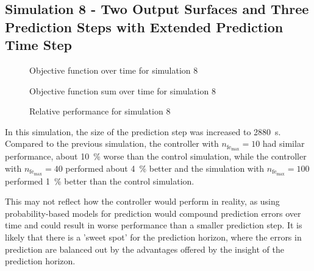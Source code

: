 \documentclass[conference]{IEEEtran}
\begin{document}
\subsection{Simulation 8 - Two Output Surfaces and Three Prediction Steps with Extended Prediction Time Step} \label{subsec:results_SS08}

\begin{figure}[h]
    \centering
    
    \caption{Objective function over time for simulation 8}
    \label{fig:SS08_obj_hist}
\end{figure}

%     

\begin{figure}[h]
    \centering
    
    \caption{Objective function sum over time for simulation 8}
    \label{fig:SS08_s_obj_hist}
\end{figure}

\begin{figure}[h]
    \centering
    
    \caption{Relative performance for simulation 8}
    \label{fig:SS08_s_obj_rel}
\end{figure}

In this simulation, the size of the prediction step was increased to \SI{2880}{\second}.
Compared to the previous simulation, the controller with $n_{\text{fe}_{\text{max}}} = 10$ had similar performance, about \SI{10}{\percent} worse than the control simulation, while the controller with $n_{\text{fe}_{\text{max}}} = 40$ performed about \SI{4}{\percent} better and the simulation with $n_{\text{fe}_{\text{max}}} = 100$ performed \SI{1}{\percent} better than the control simulation.

This may not reflect how the controller would perform in reality, as using probability-based models for prediction would compound prediction errors over time and could result in worse performance than a smaller prediction step.
It is likely that there is a 'sweet spot' for the prediction horizon, where the errors in prediction are balanced out by the advantages offered by the insight of the prediction horizon.
\end{document}
